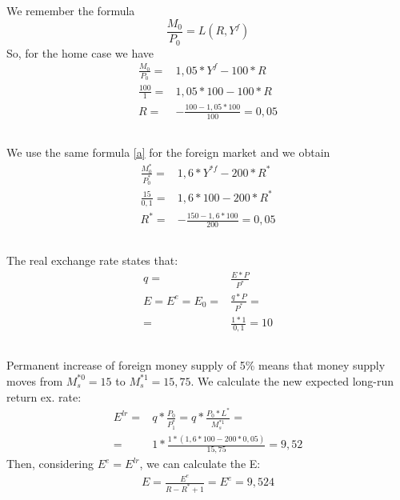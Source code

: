 \documentclass[	11pt, ]{fphw}
\begin{document}
\subsection{}
We remember the formula
\begin{equation} \label{a}
\frac{M_{0}}{P_{0}}=L(R,Y^{f})
\end{equation}
So, for the home case we have
\begin{align}
    \frac{M_{0}}{P_{0}}= &1,05* Y^{f}-100*R \\
    \frac{100}{1}=&1,05* 100-100*R \\
    R=& -\frac{100-1,05*100}{100}=0,05
\end{align}  

\subsection{}
We use the same formula \ref{a} for the foreign market and we obtain
\begin{align}
    \frac{M^{*}_{0}}{P^{*}_{0}}= &1,6* Y^{*f}-200*R^{*} \\
    \frac{15}{0,1}=&1,6 * 100-200*R^{*} \\
    R^{*}=& -\frac{150-1,6*100}{200}=0,05
\end{align}  


\subsection{}
The real exchange rate states that:
\begin{align}
    q= &\frac{E*P}{P^{*}} \\
    E=E^{e}=E_{0}=&\frac{q*P}{P^{*}}= \\
    =&\frac{1*1}{0,1}=10
\end{align}



\subsection{}
Permanent increase of foreign money supply of 5\% means that money supply moves from $M^{*0}_{s}=15$ to $M^{*1}_{s}=15,75$. 
We calculate the new expected long-run return ex. rate:
\begin{align}
    E^{lr}=&q*\frac{P_{0}}{P^{*}_{1}}=q*\frac{P_{0}* L^{*}}{M^{*1}_{s}} = \\
    =&1*\frac{1*(1,6*100-200*0,05)}{15,75}=9,52
\end{align}
Then, considering $E^{e}=E^{lr}$, we can calculate the E:
\begin{align}
    E=\frac{E^{e}}{R-R^{*}+1}=E^{e}=9,524
\end{align}
\end{document}
